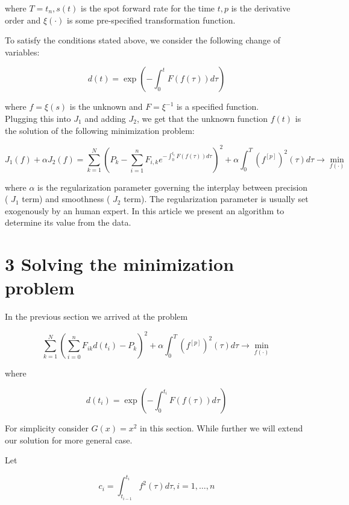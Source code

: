 \documentclass[10pt]{article}
\begin{document}
where $T=t_{n}, s(t)$ is the spot forward rate for the time $t, p$ is the derivative order and $\xi(\cdot)$ is some pre-specified transformation function.

To satisfy the conditions stated above, we consider the following change of variables:


\begin{equation*}
d(t)=\exp \left(-\int_{0}^{t} F(f(\tau)) d \tau\right) \tag{1}
\end{equation*}


where $f=\xi(s)$ is the unknown and $F=\xi^{-1}$ is a specified function.\\
Plugging this into $J_{1}$ and adding $J_{2}$, we get that the unknown function $f(t)$ is the solution of the following minimization problem:


\begin{equation*}
J_{1}(f)+\alpha J_{2}(f)=\sum_{k=1}^{N}\left(P_{k}-\sum_{i=1}^{n} F_{i, k} e^{-\int_{0}^{t_{i}} F(f(\tau)) d \tau}\right)^{2}+\alpha \int_{0}^{T}\left(f^{[p]}\right)^{2}(\tau) d \tau \rightarrow \min _{f(\cdot)} \tag{2}
\end{equation*}


where $\alpha$ is the regularization parameter governing the interplay between precision ( $J_{1}$ term) and smoothness ( $J_{2}$ term). The regularization parameter is usually set exogenously by an human expert. In this article we present an algorithm to determine its value from the data.

\section*{3 Solving the minimization problem}
In the previous section we arrived at the problem


\begin{equation*}
\sum_{k=1}^{N}\left(\sum_{i=0}^{n} F_{i k} d\left(t_{i}\right)-P_{k}\right)^{2}+\alpha \int_{0}^{T}\left(f^{[p]}\right)^{2}(\tau) d \tau \rightarrow \min _{f(\cdot)} \tag{3}
\end{equation*}


where

$$
d\left(t_{i}\right)=\exp \left(-\int_{0}^{t_{i}} F(f(\tau)) d \tau\right)
$$

For simplicity consider $G(x)=x^{2}$ in this section. While further we will extend our solution for more general case.

Let


\begin{equation*}
c_{i}=\int_{t_{i-1}}^{t_{i}} f^{2}(\tau) d \tau, i=1, \ldots, n \tag{4}
\end{equation*}
\end{document}
